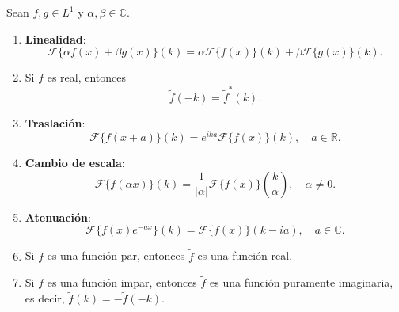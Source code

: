 \begin{propo}
Sean $f, g \in L^1$ y $\alpha, \beta \in \mathbb{C}.$

\begin{enumerate}
    \item \textbf{Linealidad}: $$\mathcal{F}\{\alpha f(x) + \beta g(x)\}(k) = \alpha \mathcal{F}\{f(x)\}(k) + \beta \mathcal{F}\{g(x)\}(k).$$ 
    
    \item Si $f$ es real, entonces $$\tilde{f}(-k) = \tilde{f}^\ast(k).$$
    
    
    \item \textbf{Traslación}: $$\mathcal{F}\{f(x+a)\}(k) = e^{ika} \mathcal{F}\{f(x)\}(k), \quad a \in \mathbb{R}.$$
    
    \item \textbf{Cambio de escala:} $$\mathcal{F}\{f(\alpha x)\}(k) = \frac{1}{|\alpha|}\mathcal{F}\{f(x)\}\left(\frac{k}{ \alpha}\right), \quad\alpha \neq 0.$$
    
    \item  \textbf{Atenuación}: $$\mathcal{F}\{f(x)e^{-ax}\}(k) =  \mathcal{F}\{f(x)\}(k-ia), \quad a \in \mathbb{C}.$$
    
    \item Si $f$ es una función par, entonces $\tilde{f}$ es una función real.
    
    \item Si $f$ es una función impar, entonces $\tilde{f}$ es una función puramente imaginaria, es decir, $\tilde{f}(k) = - \tilde{f}(-k)$.

\end{enumerate}
\end{propo}

